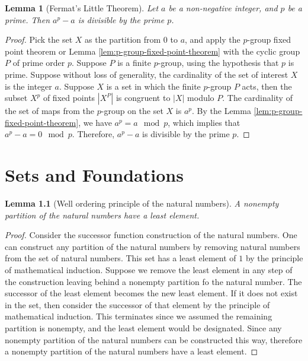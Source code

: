 \documentclass{tufte-book}
\newtheorem{lemma}[theorem]{Lemma}
\begin{document}
\begin{lemma}[Fermat's Little Theorem]
  Let $a$ be a non-negative integer, and $p$ be a prime.
  Then $a^p - a$ is divisible by the prime $p$. 
\end{lemma}

\begin{proof}
  Pick the set $X$ as the partition from $0$ to $a$, and apply the $p$-group fixed point theorem or Lemma \ref{lem:p-group-fixed-point-theorem} with the cyclic group $P$ of prime order $p$.
  Suppose $P$ is a finite $p$-group, using the hypothesis that $p$ is prime.
  Suppose without loss of generality, the cardinality of the set of interest $X$ is the integer $a$.
  Suppose $X$ is a set in which the finite $p$-group $P$ acts, then the subset $X^{p}$ of fixed points $|X^P|$ is congruent to $|X|$ modulo $P$. The cardinality of the set of maps from the $p$-group on the set $X$ is 
  $a^p$. By the Lemma \ref{lem:p-group-fixed-point-theorem}, we have $a^p = a \mod p$, which implies that $a^p - a = 0 \mod p$. Therefore, $a^p - a$ is divisible by the prime $p$.
\end{proof}

\chapter{Sets and Foundations}

\begin{lemma}[Well ordering principle of the natural numbers]
  A nonempty partition of the natural numbers have a least element.
\end{lemma}

\begin{proof}
  Consider the successor function construction of the natural numbers.
  One can construct any partition of the natural numbers by removing natural numbers from the set of natural numbers.
  This set has a least element of $1$ by the principle of mathematical induction.
  Suppose we remove the least element in any step of the construction leaving behind a nonempty partition fo the natural number. 
  The successor of the least element becomes the new least element. If it does not exist in the set, then consider the successor of that element by the principle of mathematical induction. This terminates since we assumed the remaining partition is nonempty, and the least element would be designated. Since any nonempty partition of the natural numbers can be constructed this way, therefore a nonempty partition of the natural numbers have a least element.
\end{proof}
\end{document}
